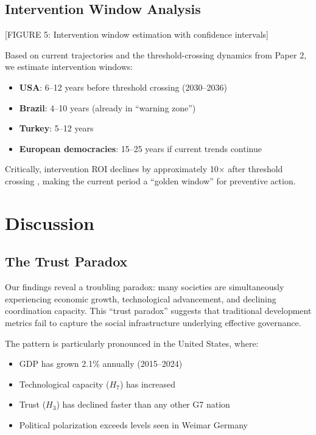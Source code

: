\documentclass[11pt,a4paper]{article}
\begin{document}
\subsection{Intervention Window Analysis}

[FIGURE 5: Intervention window estimation with confidence intervals]

Based on current trajectories and the threshold-crossing dynamics from Paper 2, we estimate intervention windows:

\begin{itemize}
\item \textbf{USA}: 6--12 years before threshold crossing (2030--2036)
\item \textbf{Brazil}: 4--10 years (already in ``warning zone'')
\item \textbf{Turkey}: 5--12 years
\item \textbf{European democracies}: 15--25 years if current trends continue
\end{itemize}

Critically, intervention ROI declines by approximately 10$\times$ after threshold crossing \citep{Paper2}, making the current period a ``golden window'' for preventive action.

\section{Discussion}

\subsection{The Trust Paradox}

Our findings reveal a troubling paradox: many societies are simultaneously experiencing economic growth, technological advancement, and declining coordination capacity. This ``trust paradox'' suggests that traditional development metrics fail to capture the social infrastructure underlying effective governance.

The pattern is particularly pronounced in the United States, where:
\begin{itemize}
\item GDP has grown 2.1\% annually (2015--2024)
\item Technological capacity ($H_7$) has increased
\item Trust ($H_3$) has declined faster than any other G7 nation
\item Political polarization exceeds levels seen in Weimar Germany
\end{itemize}
\end{document}
